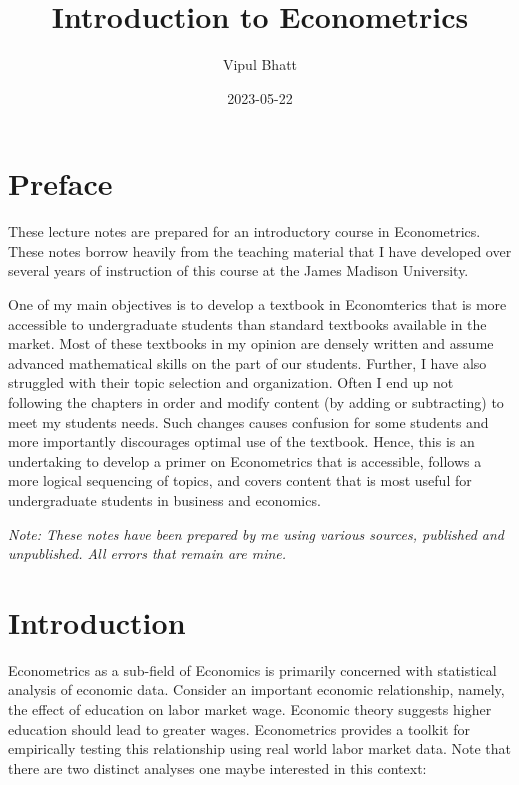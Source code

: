 \documentclass[
]{book}
\title{Introduction to Econometrics}
\author{Vipul Bhatt}
\date{2023-05-22}
\theoremstyle{definition}
\theoremstyle{definition}
\theoremstyle{definition}
\theoremstyle{definition}
\theoremstyle{remark}
\begin{document}
\maketitle

{
\setcounter{tocdepth}{1}
\tableofcontents
}
\hypertarget{preface}{%
\chapter*{Preface}\label{preface}}

These lecture notes are prepared for an introductory course in Econometrics. These notes borrow heavily from the teaching material that I have developed over several years of instruction of this course at the James Madison University.

One of my main objectives is to develop a textbook in Economterics that is more accessible to undergraduate students than standard textbooks available in the market. Most of these textbooks in my opinion are densely written and assume advanced mathematical skills on the part of our students. Further, I have also struggled with their topic selection and organization. Often I end up not following the chapters in order and modify content (by adding or subtracting) to meet my students needs. Such changes causes confusion for some students and more importantly discourages optimal use of the textbook. Hence, this is an undertaking to develop a primer on Econometrics that is accessible, follows a more logical sequencing of topics, and covers content that is most useful for undergraduate students in business and economics.

\emph{Note: These notes have been prepared by me using various sources, published and unpublished. All errors that remain are mine.}

\hypertarget{intro}{%
\chapter*{Introduction}\label{intro}}

Econometrics as a sub-field of Economics is primarily concerned with statistical analysis of economic data. Consider an important economic relationship, namely, the effect of education on labor market wage. Economic theory suggests higher education should lead to greater wages. Econometrics provides a toolkit for empirically testing this relationship using real world labor market data. Note that there are two distinct analyses one maybe interested in this context:
\end{document}
